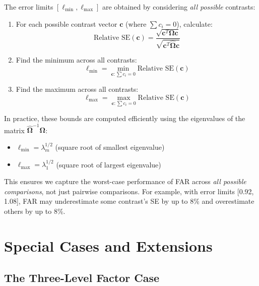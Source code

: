 \documentclass[11pt]{article}
\begin{document}
The error limits $[\ell_{\min}, \ell_{\max}]$ are obtained by considering \textit{all possible} contrasts:

\begin{enumerate}
    \item For each possible contrast vector $\mathbf{c}$ (where $\sum c_i = 0$), calculate:
    \begin{equation}
        \text{Relative SE}(\mathbf{c}) = \frac{\sqrt{\mathbf{c}^T\boldsymbol{\Omega}\mathbf{c}}}{\sqrt{\mathbf{c}^T\hat{\boldsymbol{\Omega}}\mathbf{c}}}
    \end{equation}
    
    \item Find the minimum across all contrasts:
    \begin{equation}
        \ell_{\min} = \min_{\mathbf{c}: \sum c_i = 0} \text{Relative SE}(\mathbf{c})
    \end{equation}
    
    \item Find the maximum across all contrasts:
    \begin{equation}
        \ell_{\max} = \max_{\mathbf{c}: \sum c_i = 0} \text{Relative SE}(\mathbf{c})
    \end{equation}
\end{enumerate}

In practice, these bounds are computed efficiently using the eigenvalues of the matrix $\hat{\boldsymbol{\Omega}}^{-1}\boldsymbol{\Omega}$:
\begin{itemize}
    \item $\ell_{\min} = \lambda_m^{1/2}$ (square root of smallest eigenvalue)
    \item $\ell_{\max} = \lambda_1^{1/2}$ (square root of largest eigenvalue)
\end{itemize}

This ensures we capture the worst-case performance of FAR across \textit{all possible comparisons}, not just pairwise comparisons. For example, with error limits [0.92, 1.08], FAR may underestimate some contrast's SE by up to 8\% and overestimate others by up to 8\%.
\section{Special Cases and Extensions}

\subsection{The Three-Level Factor Case}
\end{document}
